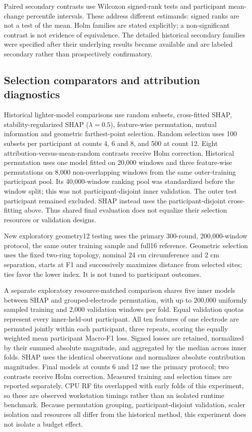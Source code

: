 Paired secondary contrasts use Wilcoxon signed-rank tests and participant mean-change percentile intervals. These address different estimands: signed ranks are not a test of the mean. Holm families are stated explicitly; a non-significant contrast is not evidence of equivalence. The detailed historical secondary families were specified after their underlying results became available and are labeled secondary rather than prospectively confirmatory.

\subsection{Selection comparators and attribution diagnostics}
Historical lighter-model comparisons use random subsets, cross-fitted SHAP, stability-regularized SHAP ($\lambda=0.5$), feature-wise permutation, mutual information and geometric farthest-point selection. Random selection uses 100 subsets per participant at counts 4, 6 and 8, and 500 at count 12. Eight attribution-versus-mean-random contrasts receive Holm correction. Historical permutation uses one model fitted on 20,000 windows and three feature-wise permutations on 8,000 non-overlapping windows from the same outer-training participant pool. Its 40,000-window ranking pool was standardized before the window split; this was not participant-disjoint inner validation. The outer test participant remained excluded. SHAP instead uses the participant-disjoint cross-fitting above. Thus shared final evaluation does not equalize their selection resources or validation designs.

New exploratory geometry12 testing uses the primary 300-round, 200,000-window protocol, the same outer training sample and full16 reference. Geometric selection uses the fixed two-ring topology, nominal 24 cm circumference and 2 cm separation, starts at F1 and successively maximizes distance from selected sites; ties favor the lower index. It is not tuned to participant outcomes.

A separate exploratory resource-matched comparison shares five inner models between SHAP and grouped-electrode permutation, with up to 200,000 uniformly sampled training and 2,000 validation windows per fold. Equal validation quotas represent every inner-held-out participant. All ten features of one electrode are permuted jointly within each participant, three repeats, scoring the equally weighted mean participant Macro-F1 loss. Signed losses are retained, normalized by their summed absolute magnitude, and aggregated by the median across inner folds. SHAP uses the identical observations and normalizes absolute contribution magnitudes. Final models at counts 6 and 12 use the primary protocol; two contrasts receive Holm correction. Measured training and selection times are reported separately. CPU RF fits overlapped with early folds of this experiment, so these are observed workstation timings rather than an isolated runtime benchmark. Because permutation grouping, participant-disjoint validation, scaler isolation and resources all differ from the historical method, this experiment does not isolate a budget effect.

